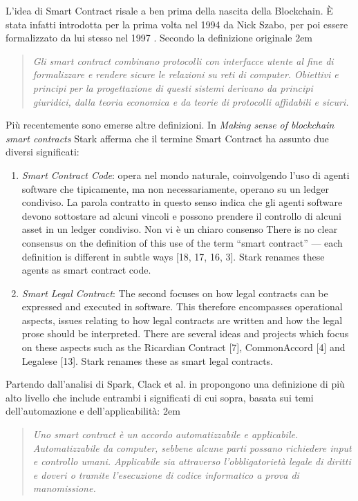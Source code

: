 L'idea di Smart Contract risale a ben prima della nascita della Blockchain. È stata infatti introdotta
per la prima volta nel 1994 da Nick Szabo, per poi
essere formalizzato da lui stesso nel 1997 \cite{szabo-smart-contracts}.
Secondo la definizione originale
\begingroup
\advance\leftmargini 2em
\begin{quote}
	{
		{\em Gli smart contract combinano protocolli con interfacce utente
				al fine di formalizzare e rendere sicure
				le relazioni su reti di computer.
				Obiettivi e principi per la progettazione di questi sistemi
				derivano da principi giuridici, dalla teoria economica
				e da teorie di protocolli affidabili e sicuri.}
	}
\end{quote}
\endgroup

Più recentemente sono emerse altre definizioni.
In \textit{Making sense of blockchain smart contracts} \cite{making-sense-of-bsc}
Stark afferma che il termine Smart Contract ha assunto due diversi significati:
\begin{enumerate}
	\item \textit{Smart Contract Code}: opera nel mondo naturale,
	      coinvolgendo l'uso di agenti software che tipicamente,
	      ma non necessariamente, operano su un ledger condiviso. La parola contratto in questo senso
	      indica che gli agenti software devono sottostare ad alcuni vincoli e possono prendere il controllo
	      di alcuni asset in un ledger condiviso. Non vi è un chiaro consenso  There is no clear consensus on the
	      definition of this use of the term “smart contract” — each definition is different in subtle
	      ways [18, 17, 16, 3]. Stark renames these agents as smart contract code.
	\item \textit{Smart Legal Contract}: The second focuses on how legal contracts can be expressed and executed in software.
	      This therefore encompasses operational aspects, issues relating to how legal contracts
	      are written and how the legal prose should be interpreted. There are several ideas and
	      projects which focus on these aspects such as the Ricardian Contract [7], CommonAccord
		      [4] and Legalese [13]. Stark renames these as smart legal contracts.
\end{enumerate}
Partendo dall'analisi di Spark, Clack et al. in \cite{Clack2016SmartCT} propongono una definizione
di più alto livello che include entrambi i significati di cui sopra, basata sui temi
dell'automazione e dell'applicabilità:
\begingroup
\advance\leftmargini 2em
\begin{quote}
	{
		{\em Uno smart contract è un accordo automatizzabile e applicabile. Automatizzabile da computer,
				sebbene alcune parti possano richiedere input e controllo umani. Applicabile sia attraverso
				l'obbligatorietà legale di diritti e doveri o tramite
				l'esecuzione di codice informatico a prova di manomissione.}
	}
\end{quote}
